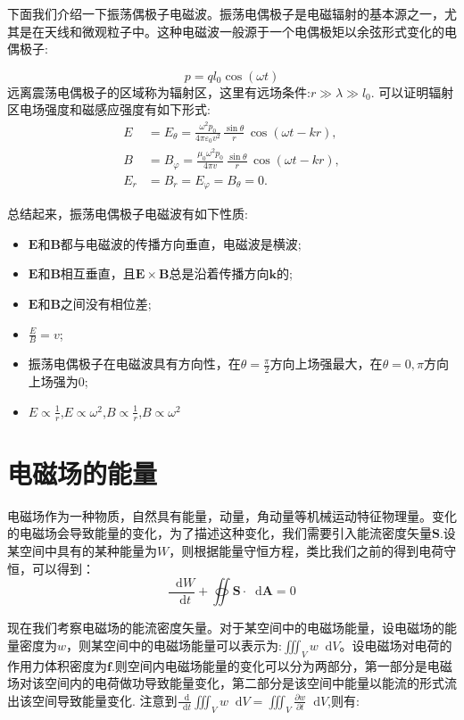 \documentclass[12pt,a4paper,oneside]{report}
\theoremstyle{definition}
\theoremstyle{remark}
\newcommand{\mb}[1]{\mathbf{#1}}
\renewcommand{\d}{\mathop{}\!\mathrm{d}}
\begin{document}
下面我们介绍一下振荡偶极子电磁波。振荡电偶极子是电磁辐射的基本源之一，尤其是在天线和微观粒子中。这种电磁波一般源于一个电偶极矩以余弦形式变化的电偶极子:

\[
p = ql_0\cos(\omega t)
\]
远离震荡电偶极子的区域称为辐射区，这里有远场条件:$r\gg\lambda\gg l_0$. 可以证明辐射区电场强度和磁感应强度有如下形式:
\begin{align*}
E &= E_\theta = \frac{\omega^2 p_0}{4\pi\varepsilon_0v^2}\,
\frac{\sin\theta}{r}\,
\cos(\omega t - kr), \\[6pt]
B &= B_\varphi = \frac{\mu_0 \omega^2 p_0}{4\pi v}\,
\frac{\sin\theta}{r}\,
\cos(\omega t - kr), \\[6pt]
E_r &= B_r = E_\varphi = B_\theta  = 0.
\end{align*}

总结起来，振荡电偶极子电磁波有如下性质:
\begin{itemize}
  \item $\mb{E}$和$\mb{B}$都与电磁波的传播方向垂直，电磁波是横波;
  \item $\mb{E}$和$\mb{B}$相互垂直，且$\mb{E}\times\mb{B}$总是沿着传播方向$\mb{k}$的;
  \item $\mb{E}$和$\mb{B}$之间没有相位差;
  \item $\frac{E}{B}=v$;
  \item 振荡电偶极子在电磁波具有方向性，在$\theta=\frac{\pi}{2}$方向上场强最大，在$\theta = 0,\pi$方向上场强为$0$;
  \item $E\propto \frac{1}{r}$,$E\propto \omega^2$,$B\propto \frac{1}{r}$,$B\propto \omega^2$
\end{itemize}

\section{电磁场的能量}
电磁场作为一种物质，自然具有能量，动量，角动量等机械运动特征物理量。变化的电磁场会导致能量的变化，为了描述这种变化，我们需要引入能流密度矢量$\mb{S}$.设某空间中具有的某种能量为$W$，则根据能量守恒方程，类比我们之前的得到电荷守恒，可以得到：
\[
\frac{\d W}{\d t} + \oiint \mb{S} \cdot \d \mb{A} = 0
\]

现在我们考察电磁场的能流密度矢量。对于某空间中的电磁场能量，设电磁场的能量密度为$w$，则某空间中的电磁场能量可以表示为:$\iiint_V w\d V$。设电磁场对电荷的作用力体积密度为$\mb{f}$.则空间内电磁场能量的变化可以分为两部分，第一部分是电磁场对该空间内的电荷做功导致能量变化，第二部分是该空间中能量以能流的形式流出该空间导致能量变化. 注意到$\frac{\d}{\d t}\iiint_V w\d V=\iiint_V  \frac{\partial w}{\partial t}\d V$,则有:
\end{document}
